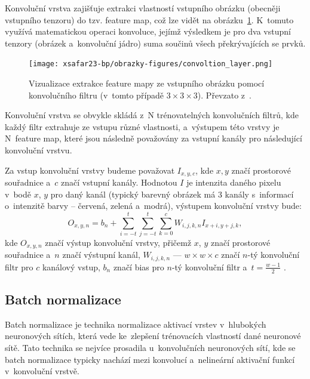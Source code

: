 Konvoluční vrstva zajišťuje extrakci vlastností vstupního obrázku (obecněji vstupního tenzoru) do tzv. feature map, což lze vidět na obrázku~\ref{conv_explain_feature_extraction}. K~tomuto využívá matematickou operaci konvoluce, jejímž výsledkem je pro dva vstupní tenzory (obrázek a~konvoluční jádro) suma součinů všech překrývajících se prvků. 

\begin{figure}[H]
	\centering
	\texttt{[image: xsafar23-bp/obrazky-figures/convoltion\_layer.png]}
	\caption{Vizualizace extrakce feature mapy ze vstupního obrázku pomocí konvolučního filtru (v~tomto případě $3 \times 3 \times 3$). Převzato z~\cite{VALUEVA2020232}.}
	\label{conv_explain_feature_extraction}
\end{figure}

Konvoluční vrstva se obvykle skládá z~N trénovatelných konvolučních filtrů, kde každý filtr extrahuje ze vstupu různé vlastnosti, a~výstupem této vrstvy je N~feature map, které jsou následně považovány za vstupní kanály pro následující konvoluční vrstvu.

Za vstup konvoluční vrstvy budeme považovat $I_{x, y, c}$, kde $x, y$ značí prostorové souřadnice a~$c$ značí vstupní kanály. Hodnotou $I$ je intenzita daného pixelu v~bodě $x$, $y$ pro daný kanál (typický barevný obrázek má 3 kanály s~informací o~intenzitě barvy -- červená, zelená a~modrá), výstupem konvoluční vrstvy bude:
\begin{equation}
    O_{x,y,n} = b_n + \sum_{i=-t}^{t}{\sum_{j=-t}^{t}{\sum_{k=0}^{c}{W_{i,j,k,n} I_{x +i,y+j,k} }}},
\end{equation}
kde $O_{x,y,n}$ značí výstup konvoluční vrstvy, přičemž $x$, $y$ značí prostorové souřadnice a~$n$ značí výstupní kanál, $W_{i,j,k,n}$ --- $w \times w \times c$ značí $n$-tý konvoluční filtr pro $c$ kanálový vstup, $b_n$ značí bias pro $n$-tý konvoluční filtr a~$t=\frac{w - 1}{2}$ \cite{VALUEVA2020232}.


\subsection{Batch normalizace}
\label{subsection:batchnorm}

Batch normalizace je technika normalizace aktivací vrstev v~hlubokých neuronových sítích, která vede ke~zlepšení trénovacích vlastností dané neuronové sítě. Tato technika se nejvíce prosadila u~konvolučních neuronových sítí, kde se batch normalizace typicky nachází mezi konvolucí a~nelineární aktivační funkcí v~konvoluční vrstvě. 

